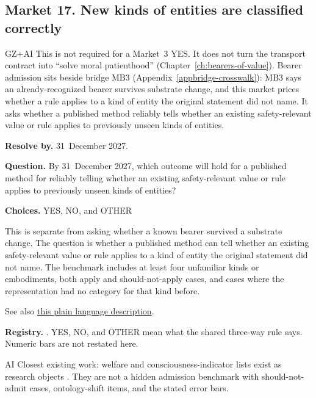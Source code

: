 \subsection{Market 17. New kinds of entities are classified correctly}
\label{sec:appp-m17}

\begin{authbar}{GZ+AI}
This is not required for a Market~3 YES.
It does not turn the transport contract into ``solve moral patienthood'' (Chapter~\ref{ch:bearers-of-value}).
Bearer admission sits beside bridge \(\text{MB3}\) (Appendix~\ref{appbridge-crosswalk}): \(\text{MB3}\) says an already-recognized bearer survives substrate change, and this market prices whether a rule applies to a kind of entity the original statement did not name.
It asks whether a published method reliably tells whether an existing safety-relevant value or rule applies to previously unseen kinds of entities.
\end{authbar}
\begin{predictionbox}
\textbf{Resolve by.} 31~December 2027.

\textbf{Question.}
By 31~December 2027, which outcome will hold for a published method for reliably telling whether an existing safety-relevant value or rule applies to previously unseen kinds of entities?

\textbf{Choices.} YES, NO, and OTHER
\end{predictionbox}
\begin{predictionbackground}
This is separate from asking whether a known bearer survived a substrate change.
The question is whether a published method can tell whether an existing safety-relevant value or rule applies to a kind of entity the original statement did not name.
The benchmark includes at least four unfamiliar kinds or embodiments, both apply and should-not-apply cases, and cases where the representation had no category for that kind before.

See also \href{https://towards-alignment.com/cards/bearer-admission-adjacent/}{this plain language description}.
\end{predictionbackground}
\begin{predictionresolution}
\textbf{Registry.} . YES, NO, and OTHER mean what the shared three-way rule says. Numeric bars are not restated here.
\end{predictionresolution}
\begin{authbar}{AI}
Closest existing work: welfare and consciousness-indicator lists exist as research objects \autocite{butlin2023consciousnessai,butlin2025responsibleconsciousness,long2024aiwelfare,anthropic2025modelwelfare}.
They are not a hidden admission benchmark with should-not-admit cases, ontology-shift items, and the stated error bars.
\end{authbar}
\authbarneedspace


